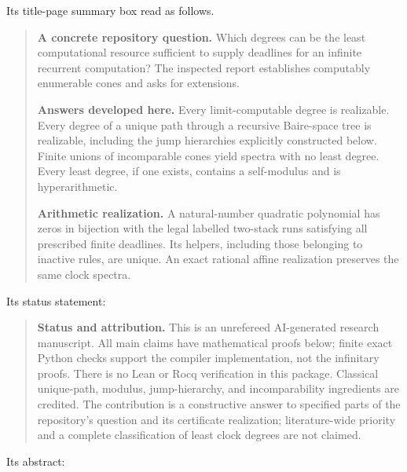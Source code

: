 \documentclass[11pt,letterpaper]{article}
\theoremstyle{definition}
\theoremstyle{remark}
\newcommand{\1}{\mathbf 1}
\begin{document}
Its title-page summary box read as follows.
\begin{quote}\small
\textbf{A concrete repository question.} Which degrees can be the least
computational resource sufficient to supply deadlines for an infinite
recurrent computation? The inspected report establishes computably
enumerable cones and asks for extensions.

\textbf{Answers developed here.} Every limit-computable degree is realizable.
Every degree of a unique path through a recursive Baire-space tree is
realizable, including the jump hierarchies explicitly constructed below.
Finite unions of incomparable cones yield spectra with no least degree.
Every least degree, if one exists, contains a self-modulus and is
hyperarithmetic.

\textbf{Arithmetic realization.} A natural-number quadratic polynomial
has zeros in bijection with the legal labelled two-stack runs satisfying
all prescribed finite deadlines. Its helpers, including those belonging
to inactive rules, are unique. An exact rational affine realization
preserves the same clock spectra.
\end{quote}
Its status statement:
\begin{quote}\small
\textbf{Status and attribution.} This is an unrefereed AI-generated research
manuscript. All main claims have mathematical proofs below; finite exact
Python checks support the compiler implementation, not the infinitary
proofs. There is no Lean or Rocq verification in this package. Classical
unique-path, modulus, jump-hierarchy, and incomparability ingredients are
credited. The contribution is a constructive answer to specified parts of
the repository's question and its certificate realization; literature-wide
priority and a complete classification of least clock degrees are not claimed.
\end{quote}
Its abstract:
\end{document}
